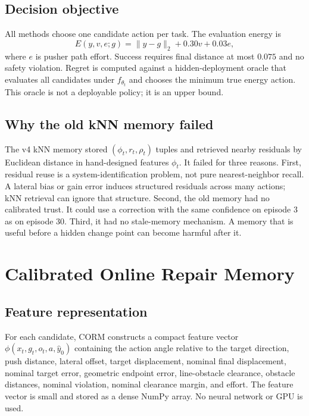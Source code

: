 \documentclass{article}
\begin{document}
\subsection{Decision objective}

All methods choose one candidate action per task. The evaluation energy is
\begin{equation}
E(y,v,e;g)=\|y-g\|_2 + 0.30 v + 0.03 e,
\end{equation}
where $e$ is pusher path effort. Success requires final distance at most $0.075$ and no safety violation. Regret is computed against a hidden-deployment oracle that evaluates all candidates under $f_{\theta_t}$ and chooses the minimum true energy action. This oracle is not a deployable policy; it is an upper bound.

\subsection{Why the old kNN memory failed}

The v4 kNN memory stored $(\phi_t,r_t,\rho_t)$ tuples and retrieved nearby residuals by Euclidean distance in hand-designed features $\phi_t$. It failed for three reasons. First, residual reuse is a system-identification problem, not pure nearest-neighbor recall. A lateral bias or gain error induces structured residuals across many actions; kNN retrieval can ignore that structure. Second, the old memory had no calibrated trust. It could use a correction with the same confidence on episode 3 as on episode 30. Third, it had no stale-memory mechanism. A memory that is useful before a hidden change point can become harmful after it.

\section{Calibrated Online Repair Memory}

\subsection{Feature representation}

For each candidate, CORM constructs a compact feature vector $\phi(x_t,g_t,o_t,a,\hat y_0)$ containing the action angle relative to the target direction, push distance, lateral offset, target displacement, nominal final displacement, nominal target error, geometric endpoint error, line-obstacle clearance, obstacle distances, nominal violation, nominal clearance margin, and effort. The feature vector is small and stored as a dense NumPy array. No neural network or GPU is used.
\end{document}
